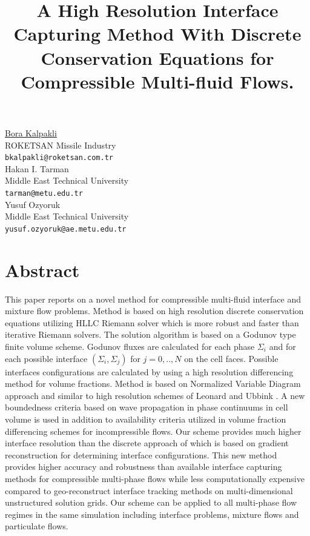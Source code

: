 \documentclass[article,A4,11pt]{llncs}%
\begin{document}
\title{A High Resolution Interface Capturing Method With Discrete Conservation Equations for Compressible Multi-fluid Flows.}
 \author{} \institute{}
\maketitle
\begin{center}
{\large \underline{Bora Kalpakli}}\\
ROKETSAN Missile Industry\\
{\tt bkalpakli@roketsan.com.tr}
\\ \vspace{4mm}
{\large Hakan I.  Tarman}\\
Middle East Technical University\\
{\tt tarman@metu.edu.tr}
\\ \vspace{4mm}
{\large Yusuf Ozyoruk}\\
Middle East Technical University\\
{\tt yusuf.ozyoruk@ae.metu.edu.tr}
\end{center}

\section*{Abstract}
This paper reports on a novel method for compressible multi-fluid interface and mixture flow problems. Method is based on high resolution discrete conservation equations utilizing HLLC Riemann solver which is more robust and faster than iterative Riemann solvers. The solution algorithm is based on a Godunov type finite volume scheme. Godunov fluxes are calculated for each phase $\Sigma_i$ and for each possible interface $\left(\Sigma_i,\Sigma_j\right)$ for $j=0,..,N$ on the cell faces. Possible interfaces configurations are calculated by using a high resolution differencing method for volume fractions. Method is based on Normalized Variable Diagram approach and similar to high resolution schemes of Leonard \cite{The ULTIMATE conservative difference scheme applied to unsteady one-dimensional advection.} and Ubbink \cite{Numerical prediction of two fluid systems with sharp interfaces}. A new boundedness criteria based on wave propagation in phase continuums in cell volume is used in addition to availability criteria utilized  in volume fraction differencing schemes for incompressible flows. Our scheme provides  much higher interface resolution than the discrete  approach of \cite{Discrete equations for physical and numerical compressible multiphase mixtures} which is based on gradient reconstruction for determining interface configurations. This new method provides higher accuracy and robustness than available interface capturing methods for compressible multi-phase flows while less computationally expensive compared to geo-reconstruct interface tracking methods on multi-dimensional unstructured solution grids. Our scheme can be applied to all multi-phase flow regimes in the same simulation including interface problems, mixture flows and particulate flows.
\end{document}
